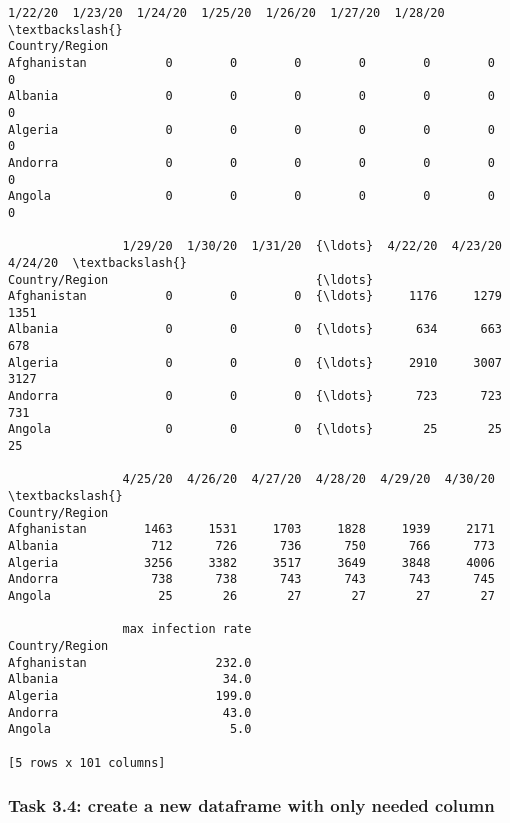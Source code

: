 \documentclass[11pt]{article}
\newcommand{\prompt}[4]{
        \llap{{\color{#2}[#3]: #4}}\vspace{-1.25em}
    }
\begin{document}
            \begin{tcolorbox}[breakable, boxrule=.5pt, size=fbox, pad at break*=1mm, opacityfill=0]
\prompt{Out}{outcolor}{19}{\hspace{3.5pt}}
\begin{Verbatim}[commandchars=\\\{\}]
                1/22/20  1/23/20  1/24/20  1/25/20  1/26/20  1/27/20  1/28/20  \textbackslash{}
Country/Region
Afghanistan           0        0        0        0        0        0        0
Albania               0        0        0        0        0        0        0
Algeria               0        0        0        0        0        0        0
Andorra               0        0        0        0        0        0        0
Angola                0        0        0        0        0        0        0

                1/29/20  1/30/20  1/31/20  {\ldots}  4/22/20  4/23/20  4/24/20  \textbackslash{}
Country/Region                             {\ldots}
Afghanistan           0        0        0  {\ldots}     1176     1279     1351
Albania               0        0        0  {\ldots}      634      663      678
Algeria               0        0        0  {\ldots}     2910     3007     3127
Andorra               0        0        0  {\ldots}      723      723      731
Angola                0        0        0  {\ldots}       25       25       25

                4/25/20  4/26/20  4/27/20  4/28/20  4/29/20  4/30/20  \textbackslash{}
Country/Region
Afghanistan        1463     1531     1703     1828     1939     2171
Albania             712      726      736      750      766      773
Algeria            3256     3382     3517     3649     3848     4006
Andorra             738      738      743      743      743      745
Angola               25       26       27       27       27       27

                max infection rate
Country/Region
Afghanistan                  232.0
Albania                       34.0
Algeria                      199.0
Andorra                       43.0
Angola                         5.0

[5 rows x 101 columns]
\end{Verbatim}
\end{tcolorbox}
        
    \hypertarget{task-3.4-create-a-new-dataframe-with-only-needed-column}{%
\subsubsection{Task 3.4: create a new dataframe with only needed
column}\label{task-3.4-create-a-new-dataframe-with-only-needed-column}}
\end{document}
